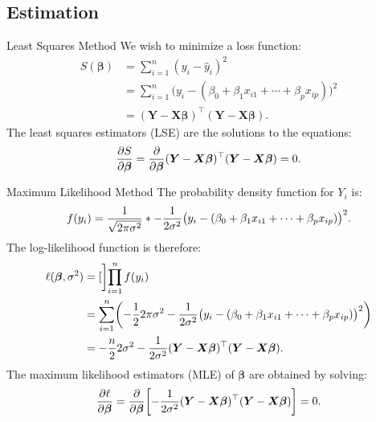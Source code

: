 \documentclass[oneside]{book}\usepackage[]{graphicx}\usepackage[svgnames]{xcolor}
\newcommand*\circled[1]{\tikz[baseline=(char.base)]{\node[shape=circle,draw,inner sep=2pt] (char) {#1};}}
\let\exp\relax%
\let\log\relax%
\providecommand{\RandomVector}[1]{\bm{#1}}%
\providecommand{\Vector}[1]{\bm{#1}}%
\providecommand{\Matrix}[1]{\bm{#1}}
\begin{document}
\subsection*{\circled{2} Estimation}
\begin{Regular}{Least Squares Method}
      We wish to minimize a loss function:
      \begin{align*}
            S(\Vector{\beta})
             & =\sum_{i=1}^{n} (y_i-\hat{y}_i)^2                                                             \\
             & =\sum_{i=1}^{n} \bigl(y_i-(\beta_0+\beta_1x_{i1}+\cdots+\beta_p x_{ip})\bigr)^2               \\
             & =(\RandomVector{Y}-\Matrix{X}\Vector{\beta})^\top(\RandomVector{Y}-\Matrix{X}\Vector{\beta}).
      \end{align*}
      The least squares estimators (LSE) are the solutions to the equations:
      \[ \pdv{S}{\Vector{\beta}}=\pdv*{(\RandomVector{Y}-\Matrix{X}\Vector{\beta})^\top(\RandomVector{Y}-\Matrix{X}\Vector{\beta})}{\Vector{\beta}}=0. \]
\end{Regular}
\begin{Regular}{Maximum Likelihood Method}
      The probability density function for $ Y_i $ is:
      \[ f(y_i)=\frac{1}{\sqrt{2\mathrm{\pi}\sigma^2}}\exp*{-\frac{1}{2\sigma^2}\bigl(y_i-(\beta_0+\beta_1x_{i1}+\cdots+\beta_p x_{ip})\bigr)^2 }.  \]
      The log-likelihood function is therefore:
      \begin{align*}
            \ell(\Vector{\beta},\sigma^2)
             & =\log[\bigg]{\prod_{i=1}^n f(y_i)}                                                                                                                         \\
             & =\sum_{i=1}^{n} \biggl(-\frac{1}{2} \log{2\mathrm{\pi}\sigma^2}-\frac{1}{2\sigma^2}\bigl(y_i-(\beta_0+\beta_1x_{i1}+\cdots+\beta_p x_{ip})\bigr)^2 \biggr) \\
             & =-\frac{n}{2} \log{2\sigma^2}-\frac{1}{2\sigma^2} (\RandomVector{Y}-\Matrix{X}\Vector{\beta})^\top(\RandomVector{Y}-\Matrix{X}\Vector{\beta}).
      \end{align*}
      The maximum likelihood estimators (MLE) of $ \Vector{\beta} $ are obtained by solving:
      \[ \pdv{\ell}{\Vector{\beta}}=\pdv*{\biggl[-\frac{1}{2\sigma^2}(\RandomVector{Y}-\Matrix{X}\Vector{\beta})^\top(\RandomVector{Y}-\Matrix{X}\Vector{\beta})\biggr]}{\Vector{\beta}}=0. \]
\end{Regular}
\end{document}
